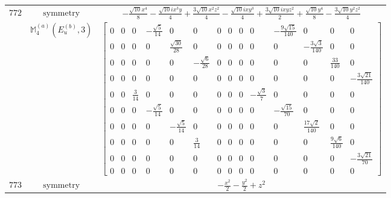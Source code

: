 \documentclass[fleqn,8pt,landscape]{jsarticle}
\begin{document}
\begin{longtable}{ccc}
$ 772 $ & $ \text{symmetry} $ & $ - \frac{\sqrt{10} x^{4}}{8} - \frac{\sqrt{10} i x^{3} y}{4} + \frac{3 \sqrt{10} x^{2} z^{2}}{4} - \frac{\sqrt{10} i x y^{3}}{4} + \frac{3 \sqrt{10} i x y z^{2}}{2} + \frac{\sqrt{10} y^{4}}{8} - \frac{3 \sqrt{10} y^{2} z^{2}}{4} $ \\
$  $ & $ \mathbb{M}_{4}^{(a)}(E_{u}^{(b)},3) $ & $ \begin{bmatrix} 0 & 0 & 0 & - \frac{\sqrt{5}}{14} & 0 & 0 & 0 & 0 & 0 & 0 & - \frac{9 \sqrt{15}}{140} & 0 & 0 & 0 \\ 0 & 0 & 0 & 0 & \frac{\sqrt{30}}{28} & 0 & 0 & 0 & 0 & 0 & 0 & - \frac{3 \sqrt{3}}{140} & 0 & 0 \\ 0 & 0 & 0 & 0 & 0 & - \frac{\sqrt{6}}{28} & 0 & 0 & 0 & 0 & 0 & 0 & \frac{33}{140} & 0 \\ 0 & 0 & 0 & 0 & 0 & 0 & 0 & 0 & 0 & 0 & 0 & 0 & 0 & - \frac{3 \sqrt{21}}{140} \\ 0 & 0 & \frac{3}{14} & 0 & 0 & 0 & 0 & 0 & 0 & - \frac{\sqrt{3}}{7} & 0 & 0 & 0 & 0 \\ 0 & 0 & 0 & - \frac{\sqrt{5}}{14} & 0 & 0 & 0 & 0 & 0 & 0 & - \frac{\sqrt{15}}{70} & 0 & 0 & 0 \\ 0 & 0 & 0 & 0 & - \frac{\sqrt{5}}{14} & 0 & 0 & 0 & 0 & 0 & 0 & \frac{17 \sqrt{2}}{140} & 0 & 0 \\ 0 & 0 & 0 & 0 & 0 & \frac{3}{14} & 0 & 0 & 0 & 0 & 0 & 0 & \frac{9 \sqrt{6}}{140} & 0 \\ 0 & 0 & 0 & 0 & 0 & 0 & 0 & 0 & 0 & 0 & 0 & 0 & 0 & - \frac{3 \sqrt{21}}{70} \\ 0 & 0 & 0 & 0 & 0 & 0 & 0 & 0 & 0 & 0 & 0 & 0 & 0 & 0 \end{bmatrix} $ \\ \hline
$ 773 $ & $ \text{symmetry} $ & $ - \frac{x^{2}}{2} - \frac{y^{2}}{2} + z^{2} $ \\

\end{longtable}
\end{document}
